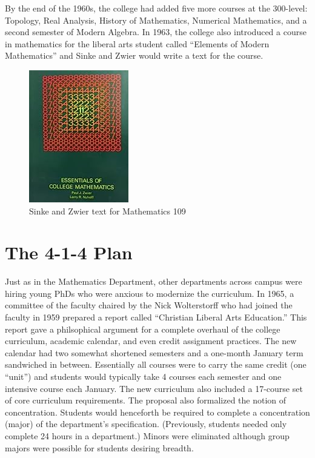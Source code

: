 \documentclass[
]{book}
\begin{document}
By the end of the 1960s, the college had added five more courses at the 300-level: Topology, Real Analysis, History of Mathematics, Numerical Mathematics, and a second semester of Modern Algebra. In 1963, the college also introduced a course in mathematics for the liberal arts student called ``Elements of Modern Mathematics'' and Sinke and Zwier would write a text for the course.

\begin{figure}

{\centering \includegraphics[width=0.5\linewidth]{images/ZwierSinke109} 

}

\caption{Sinke and Zwier text for Mathematics 109}\label{fig:zwiersink}
\end{figure}

\hypertarget{the-4-1-4-plan}{%
\section{The 4-1-4 Plan}\label{the-4-1-4-plan}}

Just as in the Mathematics Department, other departments across campus were hiring young PhDs who were anxious to modernize the curriculum. In 1965, a committee of the faculty chaired by the Nick Wolterstorff who had joined the faculty in 1959 prepared a report called ``Christian Liberal Arts Education.'' This report gave a philsophical argument for a complete overhaul of the college curriculum, academic calendar, and even credit assignment practices. The new calendar had two somewhat shortened semesters and a one-month January term sandwiched in between. Essentially all courses were to carry the same credit (one ``unit'') and students would typically take 4 courses each semester and one intensive course each January. The new curriculum also included a 17-course set of core curriculum requirements. The proposal also formalized the notion of concentration. Students would henceforth be required to complete a concentration (major) of the department's specification. (Previously, students needed only complete 24 hours in a department.) Minors were eliminated although group majors were possible for students desiring breadth.
\end{document}
